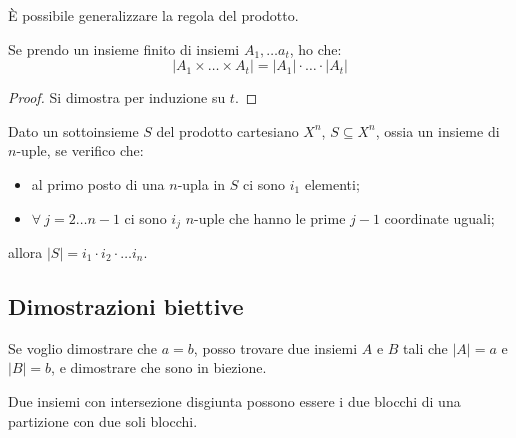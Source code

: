 \`E possibile generalizzare la regola del prodotto.
\begin{prop}
Se prendo un insieme finito di insiemi $A_1, \dots a_t$, ho che:
\[
\left| A_1 \times \dots \times A_t \right| = |A_1| \cdot \ldots \cdot |A_t|
\]
\end{prop}
\begin{proof}
Si dimostra per induzione su $t$.
\end{proof}

\begin{defn}
Dato un sottoinsieme $S$ del prodotto cartesiano $X^n$, $S \subseteq X^n$, ossia un insieme di $n$-uple, se verifico che:
\begin{itemize}
  \item al primo posto di una $n$-upla in $S$ ci sono $i_1$ elementi;
  \item $\forall \ j = 2 \dots n-1$ ci sono $i_j$ $n$-uple che hanno le prime $j-1$ coordinate uguali;
\end{itemize}
allora $|S| = i_1 \cdot i_2 \cdot \dots i_n$.
\end{defn}

\subsection{Dimostrazioni biettive}

Se voglio dimostrare che $a = b$, posso trovare due insiemi $A$ e $B$ tali che $|A| = a$ e $|B| = b$, e dimostrare che sono in biezione.

Due insiemi con intersezione disgiunta possono essere i due blocchi di una partizione con due soli blocchi.

